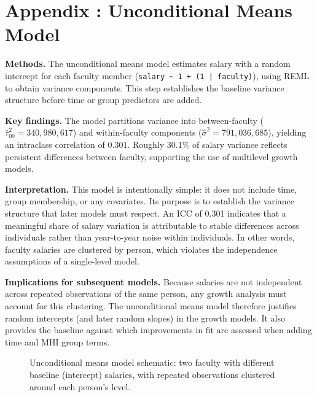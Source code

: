\documentclass{article}
\begin{document}
\section*{Appendix \thesection: Unconditional Means Model}
\label{app:unconditional_means}

\textbf{Methods.} The unconditional means model estimates salary with a random intercept for each faculty member (\texttt{salary \textasciitilde{} 1 + (1 | faculty)}), using REML to obtain variance components. This step establishes the baseline variance structure before time or group predictors are added.

\textbf{Key findings.} The model partitions variance into between-faculty (\(\hat{\tau}^2_{00} = 340{,}980{,}617\)) and within-faculty components (\(\hat{\sigma}^2 = 791{,}036{,}685\)), yielding an intraclass correlation of \(0.301\). Roughly 30.1\% of salary variance reflects persistent differences between faculty, supporting the use of multilevel growth models.

\textbf{Interpretation.} This model is intentionally simple: it does not include time, group membership, or any covariates. Its purpose is to establish the variance structure that later models must respect. An ICC of 0.301 indicates that a meaningful share of salary variation is attributable to stable differences across individuals rather than year-to-year noise within individuals. In other words, faculty salaries are clustered by person, which violates the independence assumptions of a single-level model.

\textbf{Implications for subsequent models.} Because salaries are not independent across repeated observations of the same person, any growth analysis must account for this clustering. The unconditional means model therefore justifies random intercepts (and later random slopes) in the growth models. It also provides the baseline against which improvements in fit are assessed when adding time and MHI group terms.

\begin{figure}[h]
    \centering
    \caption{Unconditional means model schematic: two faculty with different baseline (intercept) salaries, with repeated observations clustered around each person’s level.}
\end{figure}
\end{document}
